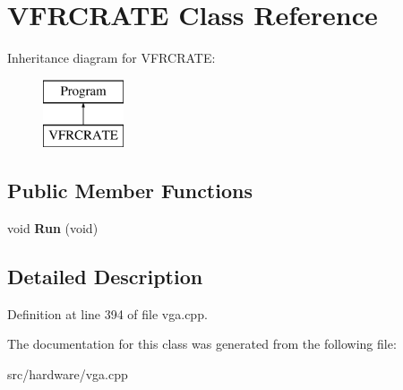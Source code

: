 \hypertarget{classVFRCRATE}{\section{V\-F\-R\-C\-R\-A\-T\-E Class Reference}
\label{classVFRCRATE}
}
Inheritance diagram for V\-F\-R\-C\-R\-A\-T\-E\-:\begin{figure}[H]
\begin{center}
\leavevmode
\includegraphics[height=2.000000cm]{classVFRCRATE}
\end{center}
\end{figure}
\subsection*{Public Member Functions}
\begin{DoxyCompactItemize}
\item 
\hypertarget{classVFRCRATE_ac9e54d65547f248ce6f97a91ebd73db2}{void {\bfseries Run} (void)}\label{classVFRCRATE_ac9e54d65547f248ce6f97a91ebd73db2}

\end{DoxyCompactItemize}


\subsection{Detailed Description}


Definition at line 394 of file vga.\-cpp.



The documentation for this class was generated from the following file\-:\begin{DoxyCompactItemize}
\item 
src/hardware/vga.\-cpp\end{DoxyCompactItemize}
